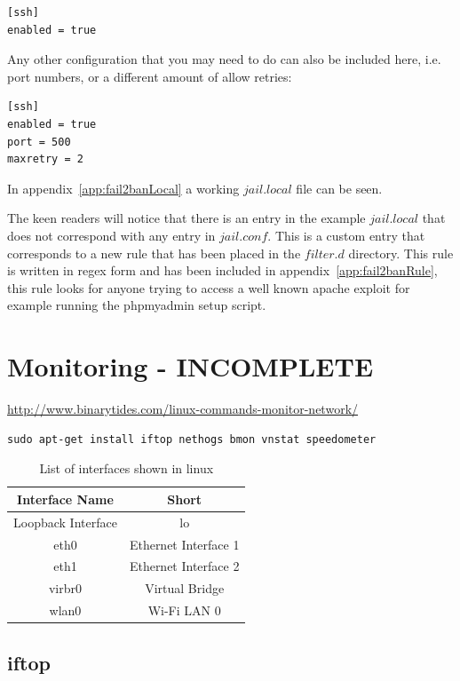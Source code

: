 \begin{verbatim}
[ssh]
enabled = true
\end{verbatim}

Any other configuration that you may need to do can also be included here, i.e. port numbers, or a different amount of allow retries:

\begin{verbatim}
[ssh]
enabled = true
port = 500
maxretry = 2
\end{verbatim}

In appendix~\ref{app:fail2banLocal} a working $jail.local$ file can be seen.

The keen readers will notice that there is an entry in the example $jail.local$ that does not correspond with any entry in $jail.conf$.  This is a custom entry that corresponds to a new rule that has been placed in the $filter.d$ directory.  This rule is written in regex form and has been included in appendix~\ref{app:fail2banRule}, this rule looks for anyone trying to access a well known apache exploit for example running the phpmyadmin setup script.


\section{Monitoring - INCOMPLETE}

\url{http://www.binarytides.com/linux-commands-monitor-network/}

\begin{lstlisting}
sudo apt-get install iftop nethogs bmon vnstat speedometer
\end{lstlisting}

\begin{table}[!th]
\centering
\begin{tabular}{cc}
\hline
Interface Name & Short\\
\hline
Loopback Interface & lo\\
eth0 & Ethernet Interface 1\\
eth1 & Ethernet Interface 2\\
virbr0 & Virtual Bridge\\
wlan0 & Wi-Fi LAN 0\\
\hline
\end{tabular}
\caption{List of interfaces shown in linux}
\label{tab:interface}
\end{table}

\subsection{iftop}

